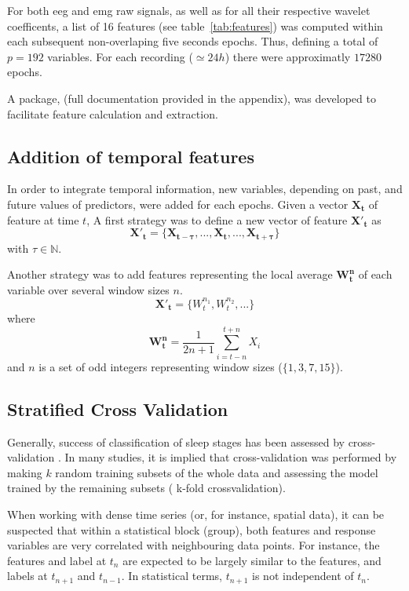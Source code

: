 For both \gls{eeg} and \gls{emg} raw signals, as well as for all their respective wavelet coefficents,
a list of 16 features (see table~\ref{tab:features}) was computed within each subsequent non-overlaping five seconds epochs.
Thus, defining a total of $p=192$ variables. For each recording ($\simeq 24h$) there were approximatly $17280$ epochs.



A \py{} package, \pr{} (full documentation provided in the appendix), was developed to facilitate feature calculation and extraction.

\subsection{Addition of temporal features}
In order to integrate temporal information, new variables, depending on past, and future values of predictors, were added for each epochs.
Given a vector $\mathbf{X_t}$ of feature at time $t$,
A first strategy was to define a new vector of feature $\mathbf{{X'}_t}$ as
\[
\mathbf{{X'}_t} = \{\mathbf{X_{t-\tau}}, ..., \mathbf{X_t}, ..., \mathbf{X_{t+\tau}}\}
\]
with $\tau \in \mathbb{N}$.

Another strategy was to add features representing the local average $\mathbf{W^n_t}$ of each variable over several window sizes $n$.
\[
\mathbf{{X'}_t} = \{W^{n_1}_t, W^{n_2}_t, ...\}
\]
where
\[
\mathbf{W^n_t} = \frac{1}{2n+1} \sum_{i = t-n}^{t+n}{X_i}
\]
and $n$ is a set of odd integers representing window sizes (\eg $\{1,3,7,15\}$).





\subsection{Stratified Cross Validation}
Generally, success of classification of sleep stages has been assessed by cross-validation \citationneeded{}.
In many studies, it is implied that cross-validation was performed by making $k$ random training subsets 
of the whole data and assessing the model trained by the remaining subsets (\ie{} k-fold crossvalidation).

When working with dense time series (or, for instance, spatial data), it can be suspected that within a statistical block (group),
both features and response variables are very correlated with neighbouring data points.
For instance, the features and label at $t_n$ are expected to be largely similar to the features, and labels at $t_{n+1}$ and $t_{n-1}$.
In statistical terms, $t_{n+1}$ is not independent of $t_{n}$.

